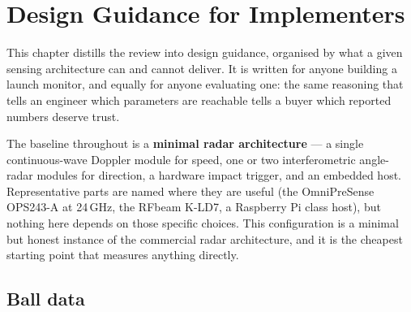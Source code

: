 \chapter{Design Guidance for Implementers}
\label{ch:implications}

This chapter distills the review into design guidance, organised by what a
given sensing architecture can and cannot deliver. It is written for anyone
building a launch monitor, and equally for anyone evaluating one: the same
reasoning that tells an engineer which parameters are reachable tells a
buyer which reported numbers deserve trust.

The baseline throughout is a \textbf{minimal radar architecture} --- a
single continuous-wave Doppler module for speed, one or two interferometric
angle-radar modules for direction, a hardware impact trigger, and an
embedded host. Representative parts are named where they are useful
(the OmniPreSense OPS243-A at 24\,GHz, the RFbeam K-LD7, a Raspberry Pi
class host), but nothing here depends on those specific choices. This
configuration is a minimal but honest instance of the commercial radar
architecture, and it is the cheapest starting point that measures anything
directly.

\section{Ball data}

